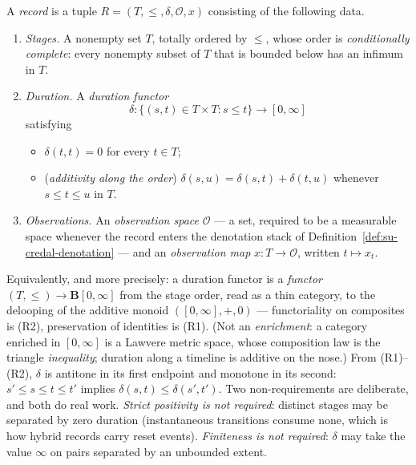 \begin{definition}[Record]\label{def:su-record}
A \emph{record} is a tuple $R = (T, \le, \delta, \mathcal{O}, x)$
consisting of the following data.
\begin{enumerate}
\item \emph{Stages.} A nonempty set $T$, totally ordered by $\le$,
  whose order is \emph{conditionally complete}: every nonempty subset
  of $T$ that is bounded below has an infimum in $T$.
\item \emph{Duration.} A \emph{duration functor}
  \[
    \delta \colon \{(s,t) \in T \times T : s \le t\}
      \longrightarrow [0, \infty]
  \]
  satisfying
  \begin{itemize}
  \item[(R1)] $\delta(t,t) = 0$ for every $t \in T$;
  \item[(R2)] (\emph{additivity along the order})
    $\delta(s,u) = \delta(s,t) + \delta(t,u)$ whenever
    $s \le t \le u$ in $T$.
  \end{itemize}
\item \emph{Observations.} An \emph{observation space} $\mathcal{O}$
  --- a set, required to be a measurable space whenever the record
  enters the denotation stack of
  Definition~\ref{def:su-credal-denotation} --- and an
  \emph{observation map} $x \colon T \to \mathcal{O}$, written
  $t \mapsto x_t$.
\end{enumerate}
Equivalently, and more precisely: a duration functor is a
\emph{functor} $(T, \le) \to \mathbf{B}[0,\infty]$ from the stage
order, read as a thin category, to the delooping of the additive
monoid $([0,\infty], +, 0)$ --- functoriality on composites is (R2),
preservation of identities is (R1). (Not an \emph{enrichment}: a
category enriched in $[0,\infty]$ is a Lawvere metric space, whose
composition law is the triangle \emph{inequality}; duration along a
timeline is additive on the nose.) From (R1)--(R2), $\delta$ is
antitone in its first endpoint and monotone in its second:
$s' \le s \le t \le t'$ implies $\delta(s,t) \le \delta(s',t')$.
Two non-requirements are deliberate, and both do real work.
\emph{Strict positivity is not required}: distinct stages may be separated by zero
duration (instantaneous transitions consume none, which is how hybrid
records carry reset events). \emph{Finiteness is not required}:
$\delta$ may take the value $\infty$ on pairs separated by an
unbounded extent.


\end{definition}
